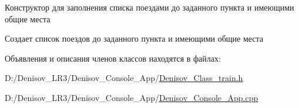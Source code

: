 Конструктор для заполнения списка поездами до заданного пункта и имеющими общие места 

Создает список поездов до заданного пункта и имеющими общие места 

Объявления и описания членов классов находятся в файлах\+:\begin{DoxyCompactItemize}
\item 
D\+:/\+Denisov\+\_\+\+L\+R3/\+Denisov\+\_\+\+Console\+\_\+\+App/\hyperlink{_denisov___class__train_8h}{Denisov\+\_\+\+Class\+\_\+train.\+h}\item 
D\+:/\+Denisov\+\_\+\+L\+R3/\+Denisov\+\_\+\+Console\+\_\+\+App/\hyperlink{_denisov___console___app_8cpp}{Denisov\+\_\+\+Console\+\_\+\+App.\+cpp}\end{DoxyCompactItemize}
